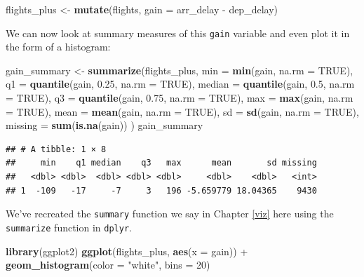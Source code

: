 \documentclass[]{tufte-book}
\newenvironment{Shaded}{\begin{snugshade}}{\end{snugshade}}
\newcommand{\KeywordTok}[1]{\textcolor[rgb]{0.13,0.29,0.53}{\textbf{{#1}}}}
\newcommand{\DataTypeTok}[1]{\textcolor[rgb]{0.13,0.29,0.53}{{#1}}}
\newcommand{\DecValTok}[1]{\textcolor[rgb]{0.00,0.00,0.81}{{#1}}}
\newcommand{\FloatTok}[1]{\textcolor[rgb]{0.00,0.00,0.81}{{#1}}}
\newcommand{\StringTok}[1]{\textcolor[rgb]{0.31,0.60,0.02}{{#1}}}
\newcommand{\OtherTok}[1]{\textcolor[rgb]{0.56,0.35,0.01}{{#1}}}
\newcommand{\NormalTok}[1]{{#1}}
\begin{document}
\begin{Shaded}
\begin{Highlighting}[]
\NormalTok{flights_plus <-}\StringTok{ }\KeywordTok{mutate}\NormalTok{(flights,}
         \DataTypeTok{gain =} \NormalTok{arr_delay -}\StringTok{ }\NormalTok{dep_delay)}
\end{Highlighting}
\end{Shaded}

We can now look at summary measures of this \texttt{gain} variable and
even plot it in the form of a histogram:

\begin{Shaded}
\begin{Highlighting}[]
\NormalTok{gain_summary <-}\StringTok{ }\KeywordTok{summarize}\NormalTok{(flights_plus,}
          \DataTypeTok{min =} \KeywordTok{min}\NormalTok{(gain, }\DataTypeTok{na.rm =} \OtherTok{TRUE}\NormalTok{),}
          \DataTypeTok{q1 =} \KeywordTok{quantile}\NormalTok{(gain, }\FloatTok{0.25}\NormalTok{, }\DataTypeTok{na.rm =} \OtherTok{TRUE}\NormalTok{),}
          \DataTypeTok{median =} \KeywordTok{quantile}\NormalTok{(gain, }\FloatTok{0.5}\NormalTok{, }\DataTypeTok{na.rm =} \OtherTok{TRUE}\NormalTok{),}
          \DataTypeTok{q3 =} \KeywordTok{quantile}\NormalTok{(gain, }\FloatTok{0.75}\NormalTok{, }\DataTypeTok{na.rm =} \OtherTok{TRUE}\NormalTok{),}
          \DataTypeTok{max =} \KeywordTok{max}\NormalTok{(gain, }\DataTypeTok{na.rm =} \OtherTok{TRUE}\NormalTok{),}
          \DataTypeTok{mean =} \KeywordTok{mean}\NormalTok{(gain, }\DataTypeTok{na.rm =} \OtherTok{TRUE}\NormalTok{),}
          \DataTypeTok{sd =} \KeywordTok{sd}\NormalTok{(gain, }\DataTypeTok{na.rm =} \OtherTok{TRUE}\NormalTok{),}
          \DataTypeTok{missing =} \KeywordTok{sum}\NormalTok{(}\KeywordTok{is.na}\NormalTok{(gain))}
\NormalTok{)}
\NormalTok{gain_summary}
\end{Highlighting}
\end{Shaded}

\begin{verbatim}
## # A tibble: 1 × 8
##     min    q1 median    q3   max      mean       sd missing
##   <dbl> <dbl>  <dbl> <dbl> <dbl>     <dbl>    <dbl>   <int>
## 1  -109   -17     -7     3   196 -5.659779 18.04365    9430
\end{verbatim}

We've recreated the \texttt{summary} function we say in Chapter
\ref{viz} here using the \texttt{summarize} function in \texttt{dplyr}.

\begin{Shaded}
\begin{Highlighting}[]
\KeywordTok{library}\NormalTok{(ggplot2)}
\KeywordTok{ggplot}\NormalTok{(flights_plus, }\KeywordTok{aes}\NormalTok{(}\DataTypeTok{x =} \NormalTok{gain)) +}
\StringTok{  }\KeywordTok{geom_histogram}\NormalTok{(}\DataTypeTok{color =} \StringTok{"white"}\NormalTok{, }\DataTypeTok{bins =} \DecValTok{20}\NormalTok{)}
\end{Highlighting}
\end{Shaded}
\end{document}
